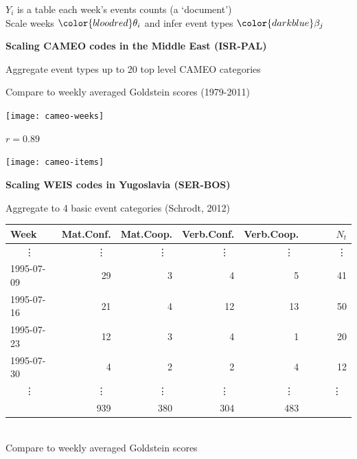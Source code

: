 \documentclass{mediumfoils}
\newcommand{\mkgrey}[1]{{\color{pale}#1}}
\begin{document}
$Y_i$ is a table each week's events counts (a `document')\\
Scale weeks ${\color{bloodred}\theta_i}$ and infer event types ${\color{darkblue}\beta_j}$



\textbf{Scaling CAMEO codes in the Middle East (ISR-PAL)}

Aggregate event types up to 20 top level CAMEO categories

Compare to weekly averaged Goldstein scores (1979-2011)


\centerline{\texttt{[image: cameo-weeks]}}
\centerline{$r=0.89$}


\begin{center}
\texttt{[image: cameo-items]}
\end{center}


\textbf{Scaling WEIS codes in Yugoslavia (SER-BOS)}

Aggregate to 4 basic event categories \mkgrey{(Schrodt, 2012)}

{\footnotesize
\begin{center}
\begin{tabular}{lrrrrr} \toprule
Week & Mat.Conf. & Mat.Coop. & Verb.Conf. & Verb.Coop. & ~~~~~$N_t$ \\ \midrule
~~~\vdots &  \vdots~ & \vdots~ & \vdots~ & \vdots~ &  \vdots\\
1995-07-09  &     29   &     3  &      4  &      5  & 41\\
1995-07-16  &     21   &     4  &     12  &     13  & 50\\
1995-07-23  &     12   &     3  &      4  &      1  & 20 \\
1995-07-30  &      4   &     2  &      2  &      4  & 12\\ 
~~~\vdots &  \vdots~ & \vdots~ & \vdots~ & \vdots~ & \vdots~\\ \midrule 
            &      939 &  380  &    304  &    483 &  \\
\bottomrule
\end{tabular}
\end{center}
}

~\\
Compare to weekly averaged Goldstein scores

\end{document}
